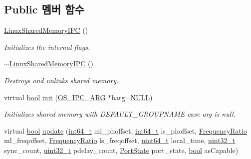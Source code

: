 \subsection*{Public 멤버 함수}
\begin{DoxyCompactItemize}
\item 
\hyperlink{class_linux_shared_memory_i_p_c_a5f9cb1732c5cd54813f256289d48e4dc}{Linux\+Shared\+Memory\+I\+PC} ()
\begin{DoxyCompactList}\small\item\em Initializes the internal flags. \end{DoxyCompactList}\item 
\hyperlink{class_linux_shared_memory_i_p_c_a7e343598b44f9404bb87fa4a2425dbfa}{$\sim$\+Linux\+Shared\+Memory\+I\+PC} ()
\begin{DoxyCompactList}\small\item\em Destroys and unlinks shared memory. \end{DoxyCompactList}\item 
virtual \hyperlink{avb__gptp_8h_af6a258d8f3ee5206d682d799316314b1}{bool} \hyperlink{class_linux_shared_memory_i_p_c_a85bbef59c73cce4fa55073cbe8b33e48}{init} (\hyperlink{class_o_s___i_p_c___a_r_g}{O\+S\+\_\+\+I\+P\+C\+\_\+\+A\+RG} $\ast$barg=\hyperlink{openavb__types__base__pub_8h_a070d2ce7b6bb7e5c05602aa8c308d0c4}{N\+U\+LL})
\begin{DoxyCompactList}\small\item\em Initializes shared memory with D\+E\+F\+A\+U\+L\+T\+\_\+\+G\+R\+O\+U\+P\+N\+A\+ME case arg is null. \end{DoxyCompactList}\item 
virtual \hyperlink{avb__gptp_8h_af6a258d8f3ee5206d682d799316314b1}{bool} \hyperlink{class_linux_shared_memory_i_p_c_a9787157f53c3480d0182833ddd05d20c}{update} (\hyperlink{parse_8c_a67a9885ef4908cb72ce26d75b694386c}{int64\+\_\+t} ml\+\_\+phoffset, \hyperlink{parse_8c_a67a9885ef4908cb72ce26d75b694386c}{int64\+\_\+t} ls\+\_\+phoffset, \hyperlink{ptptypes_8hpp_a84de47dc2ed889ecd2b61706d3ad0f2e}{Frequency\+Ratio} ml\+\_\+freqoffset, \hyperlink{ptptypes_8hpp_a84de47dc2ed889ecd2b61706d3ad0f2e}{Frequency\+Ratio} ls\+\_\+freqoffset, \hyperlink{parse_8c_aec6fcb673ff035718c238c8c9d544c47}{uint64\+\_\+t} local\+\_\+time, \hyperlink{parse_8c_a6eb1e68cc391dd753bc8ce896dbb8315}{uint32\+\_\+t} sync\+\_\+count, \hyperlink{parse_8c_a6eb1e68cc391dd753bc8ce896dbb8315}{uint32\+\_\+t} pdelay\+\_\+count, \hyperlink{ptptypes_8hpp_a679431f1afc75d7bb9e972c022e53672}{Port\+State} port\+\_\+state, \hyperlink{avb__gptp_8h_af6a258d8f3ee5206d682d799316314b1}{bool} as\+Capable)

\end{DoxyCompactItemize}
